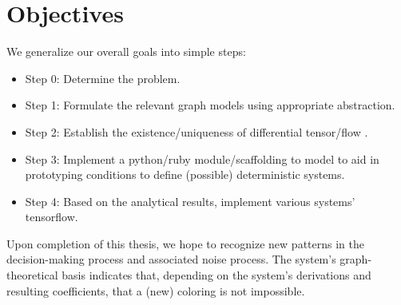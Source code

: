 \section{Objectives}
\label{sec:Objectives}

We generalize our overall goals into simple steps:
\begin{itemize}
    \item Step 0: Determine the problem.
	\item Step 1: Formulate the relevant graph models using appropriate abstraction.
	\item Step 2: Establish the existence/uniqueness of differential tensor/flow .
	\item Step 3: Implement a python/ruby module/scaffolding to model to aid in prototyping
    conditions to define (possible) deterministic systems. 
	\item Step 4: Based on the analytical results, implement various systems' tensorflow.
\end{itemize}

Upon completion of this thesis, we hope to recognize new patterns in the
decision-making process and associated noise process. The system's graph-theoretical basis indicates that, depending on
the system's derivations and resulting coefficients, that a (new) coloring is not impossible.
